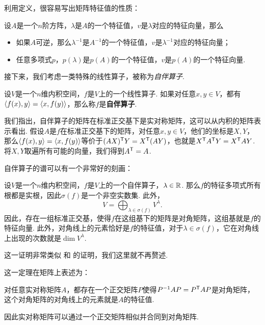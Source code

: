利用定义，很容易写出矩阵特征值的性质：
\begin{proposition}
设$A$是一个$n$阶方阵，$\lambda$是$A$的一个特征值，$v$是$\lambda$对应的特征向量，那么
\begin{itemize}
    \item 如果$A$可逆，那么$\lambda^{-1}$是$A^{-1}$的一个特征值，$v$是$\lambda^{-1}$对应的特征向量；
    \item 任意多项式$p$，$p(\lambda)$是$p(A)$的一个特征值，$v$是$p(A)$的一个特征向量. 
\end{itemize}
\end{proposition}

接下来，我们考虑一类特殊的线性算子，被称为\emph{自伴算子}.

\begin{definition}[自伴算子]
设$V$是一个$n$维内积空间，$f$是$V$上的一个线性算子. 如果对任意$x,y\in V$，都有$\left\langle{f(x)},{y}\right\rangle=\left\langle{x},{f(y)}\right\rangle$，那么称$f$是\textbf{自伴算子}. 
\end{definition}

我们指出，自伴算子的矩阵在标准正交基下是实对称矩阵，这可以从内积的矩阵表示看出. 假设$A$是$f$在标准正交基下的矩阵，对任意$x,y\in V$，他们的坐标是$X,Y$，那么$\left\langle{f(x)},{y}\right\rangle=\left\langle{x},{f(y)}\right\rangle$等价于$(AX)^{\mathsf{T}} Y=X^{\mathsf{T}}(AY)$，也就是$X^{\mathsf{T}} A^{\mathsf{T}} Y=X^{\mathsf{T}} AY$. 将$X,Y$取遍所有可能的向量，我们得到$A^{\mathsf{T}}=A$.

自伴算子的谱可以有一个非常好的刻画：
\begin{theorem}\label{thm:symmetric-operator-spectrum}
    设$V$是一个$n$维内积空间，$f$是$V$上的一个自伴算子，$\lambda\in\mathbb{R}$. 那么$f$的特征多项式所有根都是实根，因此$\sigma(f)$是一个非空实数集. 此外，
    \[V=\bigoplus_{\lambda\in\sigma(f)}V^\lambda.\]
    因此，存在一组标准正交基，使得$f$在这组基下的矩阵是对角矩阵，这组基就是$f$的特征向量. 此外，对角线上的元素恰好是$f$的特征值，对于$\lambda\in\sigma(f)$，它在对角线上出现的次数就是$\dim V^\lambda$. 
\end{theorem}

这一证明非常类似 和 的证明，我们这里就不再赘述. 

这一定理在矩阵上表述为：
\begin{corollary}\label{cor:symmetric-matrix-spectrum}
对任意实对称矩阵$A$，都存在一个正交矩阵$P$使得$P^{-1}AP=P^{\mathsf{T}} AP$是对角矩阵，这个对角矩阵的对角线上的元素就是$A$的特征值. 
\end{corollary}

因此实对称矩阵可以通过一个正交矩阵相似并合同到对角矩阵. 


